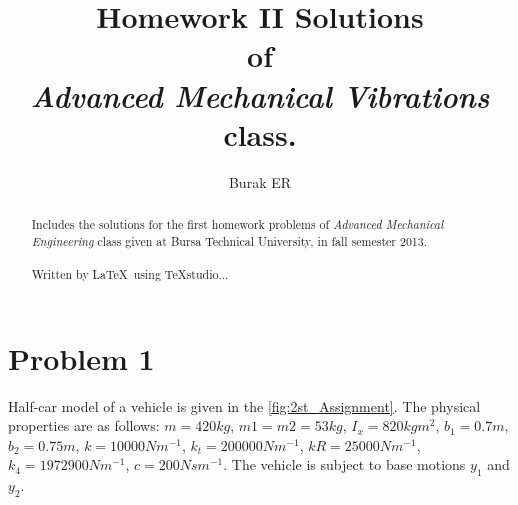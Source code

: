 \documentclass[]{report}
\title{Homework II Solutions \\ of \\ \emph{Advanced Mechanical Vibrations} class.}
\author{Burak ER}
\begin{document}
\maketitle
\begin{abstract}
Includes the solutions for the first homework problems of \emph{Advanced Mechanical Engineering} class given at Bursa Technical University, in fall semester 2013.
\\
\\
Written by \LaTeX ~using TeXstudio...
\end{abstract}
\section*{Problem 1}
Half-car model of a vehicle is given in the \cref{fig:2st_Assignment}. The physical properties are as follows: $m=420kg$, $m1=m2=53kg$, $I_x=820 kgm^2$, $b_1=0.7m$, $b_2=0.75m$, $k =10000Nm^{-1}$, $k_t=200000 Nm^{-1}$, $kR=25000 Nm^{-1}$, $k_4= 1972900 Nm^{-1}$, $c=200 Nsm^{-1}$. The vehicle is subject to base motions $y_1$ and $y_2$.
\end{document}
